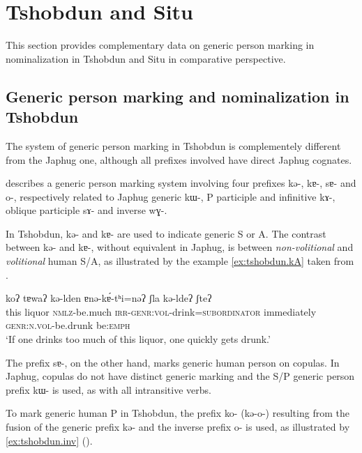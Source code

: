 \documentclass[oldfontcommands,oneside,a4paper,11pt]{article}
\newcommand{\ipa}[1]{{\phon \mbox{#1}}} %
\begin{document}
 \section{Tshobdun and Situ}

This section provides complementary data on generic person marking in nominalization in Tshobdun and Situ in comparative perspective.

\subsection{Generic person marking and nominalization in Tshobdun} \label{tshobdun.genr}
The system of generic person marking in Tshobdun is complementely different from the Japhug one, although all prefixes involved have direct Japhug cognates.

\citet{sun14generic} describes a generic person marking system involving four prefixes \ipa{kə-}, \ipa{kɐ-}, \ipa{sɐ-} and \ipa{o-}, respectively related to Japhug generic  \ipa{kɯ-}, P participle and infinitive \ipa{kɤ-}, oblique participle \ipa{sɤ-} and inverse \ipa{wɣ-}. 

In Tshobdun, \ipa{kə-} and \ipa{kɐ-} are used to indicate generic S or A. The contrast between \ipa{kə-} and \ipa{kɐ-}, without equivalent in Japhug, is between 	 \textit{non-volitional} and  \textit{volitional} human S/A, as illustrated by the   example \ref{ex:tshobdun.kA} taken from \citet[238]{sun14generic}.
 \begin{exe}
\ex \label{ex:tshobdun.kA}
\gll
\ipa{koʔ}  	\ipa{tɐwaʔ}  	\ipa{kə-lden}  	\ipa{ɐnə-kɐ́-tʰi=nəʔ}  	\ipa{ʃla}  	\ipa{kə-ldeʔ}  	\ipa{ʃteʔ}   \\
 this liquor \textsc{nmlz}-be.much \textsc{irr-genr:vol}-drink=\textsc{subordinator}  immediately \textsc{genr:n.vol}-be.drunk be:\textsc{emph} \\
\glt  ‘If one drinks too much of this liquor, one quickly gets drunk.’ 
 \end{exe}
 
 The prefix \ipa{sɐ-}, on the other hand, marks generic human person on copulas. In Japhug, copulas do not have distinct generic marking and the S/P generic person prefix \ipa{kɯ-} is used, as with all intransitive verbs.
 
To mark generic human P in Tshobdun, the prefix \ipa{ko-} (\ipa{kə-o-}) resulting from the  fusion  of  the generic prefix \ipa{kə-} and the inverse prefix \ipa{o-} is used, as illustrated by \ref{ex:tshobdun.inv} (\citealt[240]{sun14generic}).
\end{document}
